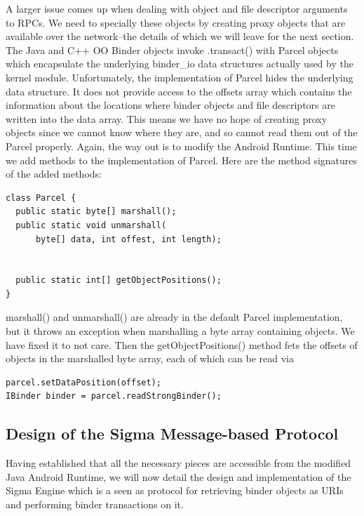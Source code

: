 \documentclass[prodmode]{acmlarge}
\begin{document}
A larger issue comes up when dealing with object and file descriptor arguments to RPCs. We need to specially these objects by creating proxy objects that are available over the network--the details of which we will leave for the next section. The Java and C++ OO Binder objects invoke .transact() with Parcel objects which encapsulate the underlying binder\_io data structures actually used by the kernel module. Unfortunately, the implementation of Parcel hides the underlying data structure. It does not provide access to the offsets array which contains the information about the locations where binder objects and file descriptors are written into the data array. This means we have no hope of creating proxy objects since we cannot know where they are, and so cannot read them out of the Parcel properly.
Again, the way out is to modify the Android Runtime. This time we add methods to the implementation of Parcel. Here are the method signatures of the added methods:
\begin{Verbatim}[samepage=true]
class Parcel {
  public static byte[] marshall();
  public static void unmarshall(
      byte[] data, int offest, int length);


  public static int[] getObjectPositions();
}
\end{Verbatim}

marshall() and unmarshall() are already in the default Parcel implementation, but it throws an exception when marshalling a byte array containing objects. We have fixed it to not care. Then the getObjectPositions() method fets the offsets of objects in the marshalled byte array, each of which can be read via
\begin{Verbatim}[samepage=true]
parcel.setDataPosition(offset);
IBinder binder = parcel.readStrongBinder();
\end{Verbatim}

\subsection{Design of the Sigma Message-based Protocol}
Having established that all the necessary pieces are accessible from the modified Java Android Runtime, we will now detail the design and implementation of the Sigma Engine which is a seen as protocol for retrieving binder objects as URIs and performing binder transactions on it.
\end{document}
